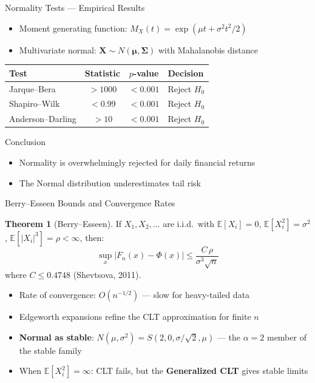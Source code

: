 \documentclass[9pt, aspectratio=169, t]{beamer}
\theoremstyle{definition}
\newtheorem{thm}{Theorem}
\newcommand{\E}{\mathbb{E}}
\begin{document}
\begin{frame}{Normality Tests --- Empirical Results}
\begin{itemize}
\item Moment generating function: $M_X(t) = \exp(\mu t + \sigma^2 t^2/2)$
\item Multivariate normal: $\bm{X} \sim N(\bm{\mu}, \bm{\Sigma})$ with Mahalanobis distance
\end{itemize}

\vspace{0.1cm}
\begin{center}
\renewcommand{\arraystretch}{1.0}
\begin{tabular}{lccl}
\toprule
\textbf{Test} & \textbf{Statistic} & \textbf{$p$-value} & \textbf{Decision} \\
\midrule
Jarque--Bera & $>1000$ & $<0.001$ & Reject $H_0$ \\
Shapiro--Wilk & $<0.99$ & $<0.001$ & Reject $H_0$ \\
Anderson--Darling & $>10$ & $<0.001$ & Reject $H_0$ \\
\bottomrule
\end{tabular}
\end{center}

\begin{alertblock}{Conclusion}
\begin{itemize}
\item Normality is overwhelmingly rejected for daily financial returns
\item The Normal distribution underestimates tail risk
\end{itemize}
\end{alertblock}
\end{frame}

\begin{frame}{Berry--Esseen Bounds and Convergence Rates}
\begin{thm}[Berry--Esseen]
If $X_1, X_2, \ldots$ are i.i.d.\ with $\E[X_i]=0$, $\E[X_i^2]=\sigma^2$, $\E[|X_i|^3]=\rho < \infty$, then:
\[
\sup_x \left|F_n(x) - \Phi(x)\right| \leq \frac{C\,\rho}{\sigma^3\sqrt{n}}
\]
where $C \leq 0.4748$ (Shevtsova, 2011).
\end{thm}

\begin{itemize}
\item Rate of convergence: $O(n^{-1/2})$ --- slow for heavy-tailed data
\item Edgeworth expansions refine the CLT approximation for finite $n$
\item \textbf{Normal as stable}: $N(\mu,\sigma^2) = S(2, 0, \sigma/\sqrt{2}, \mu)$ --- the $\alpha=2$ member of the stable family
\item When $\E[X_i^2] = \infty$: CLT fails, but the \textbf{Generalized CLT} gives stable limits
\end{itemize}
\end{frame}
\end{document}
